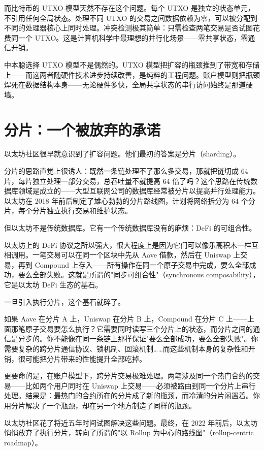 \documentclass[a4paper,12pt,openany]{ctexbook}
\begin{document}
而比特币的 UTXO 模型天然不存在这个问题。每个 UTXO 是独立的状态单元，不引用任何全局状态。处理不同 UTXO 的交易之间数据依赖为零，可以被分配到不同的处理器核心上同时处理。冲突检测极其简单：只需检查两笔交易是否试图花费同一个 UTXO。这是计算机科学中最理想的并行化场景——零共享状态，零通信开销。

中本聪选择 UTXO 模型不是偶然的。UTXO 模型把扩容的瓶颈推到了带宽和存储上——而这两者随硬件技术进步持续改善，是纯粹的工程问题。账户模型则把瓶颈焊死在数据结构本身——无论硬件多快，全局共享状态的串行访问始终是那道硬墙。


\section*{分片：一个被放弃的承诺}


以太坊社区很早就意识到了扩容问题。他们最初的答案是分片（sharding）。

分片的思路直觉上很诱人：既然一条链处理不了那么多交易，那就把链切成 64 片，每片独立处理一部分交易，总吞吐量不就提高 64 倍了吗？这个思路在传统数据库领域是成立的——大型互联网公司的数据库经常被分片以提高并行处理能力。以太坊在 2018 年前后制定了雄心勃勃的分片路线图，计划将网络拆分为 64 个分片，每个分片独立执行交易和维护状态。

但以太坊不是传统数据库。它有一个传统数据库没有的麻烦：DeFi 的可组合性。

以太坊上的 DeFi 协议之所以强大，很大程度上是因为它们可以像乐高积木一样互相调用。一笔交易可以在同一个区块中先从 Aave 借款，然后在 Uniswap 上交易，再到 Compound 上存入——所有操作在同一个原子交易中完成，要么全部成功，要么全部失败。这就是所谓的"同步可组合性"（synchronous composability），它是以太坊 DeFi 生态的基石。

一旦引入执行分片，这个基石就碎了。

如果 Aave 在分片 A 上，Uniswap 在分片 B 上，Compound 在分片 C 上——上面那笔原子交易要怎么执行？它需要同时读写三个分片上的状态，而分片之间的通信是异步的。你不能像在同一条链上那样保证"要么全部成功，要么全部失败"。你需要复杂的跨分片通信协议、锁机制、回滚机制……而这些机制本身的复杂性和开销，很可能把分片带来的性能提升全部吃掉。

更要命的是，在账户模型下，跨分片交易极难处理。两笔涉及同一个热门合约的交易——比如两个用户同时在 Uniswap 上交易——必须被路由到同一个分片上串行处理。结果是：最热门的合约所在的分片成了新的瓶颈，而冷清的分片闲置着。你用分片解决了一个瓶颈，却在另一个地方制造了同样的瓶颈。

以太坊社区花了将近五年时间试图解决这些问题。最终，在 2022 年前后，以太坊悄悄放弃了执行分片，转向了所谓的"以 Rollup 为中心的路线图"（rollup-centric roadmap）。
\end{document}
